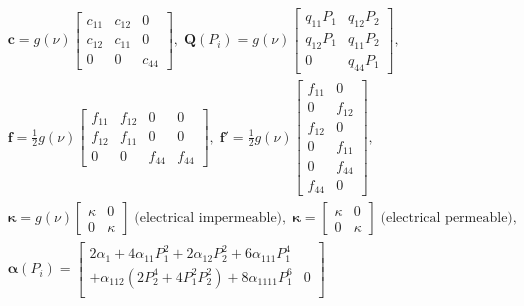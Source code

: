 \documentclass[times,fleqn,11pt]{elsarticle}
\begin{document}
\begin{equation}
    \begin{split}
        &
        {\mathbf{c}}=g(\nu)\begin{bmatrix}
            c_{11} & c_{12} & 0 \\
            c_{12} & c_{11} & 0 \\
            0 & 0 & c_{44}
        \end{bmatrix},\;
        {\mathbf{Q}(P_i)}=g(\nu)\begin{bmatrix}
            q_{11}P_1 & q_{12}P_2 \\
            q_{12}P_1 & q_{11}P_2 \\
            0 &  q_{44}P_1
        \end{bmatrix},\;\\
        &
        {\mathbf{f}}=\frac{1}{2}g(\nu)\begin{bmatrix}
            f_{11} & f_{12} & 0 & 0 \\
            f_{12} & f_{11} & 0 & 0 \\
            0 & 0 & f_{44} & f_{44}
        \end{bmatrix}, \;
        {\mathbf{f}'}=\frac{1}{2}g(\nu)\begin{bmatrix}
            f_{11} & 0 \\
            0 & f_{12} \\
            f_{12} & 0 \\
            0 & f_{11} \\
            0 & f_{44} \\
            f_{44} & 0
        \end{bmatrix},\\
        &
        {\mathbf{\kappa}}=g(\nu)\begin{bmatrix}
            \kappa & 0 \\
            0 & \kappa
        \end{bmatrix}\; \text{(electrical impermeable)},\;
        {\mathbf{\kappa}}=\begin{bmatrix}
            \kappa & 0 \\
            0 & \kappa
        \end{bmatrix}\; \text{(electrical permeable)},\; \\
        &
        \mathbf{\alpha}(P_i)=\begin{bmatrix}
             2\alpha_1+4\alpha_{11}P_1^2+2\alpha_{12}P_2^2+6\alpha_{111}P_1^4 & {}\\
             +\alpha_{112}(2P_2^4+4P_1^2P_2^2)+8\alpha_{1111}P_1^6  & 0\\

\end{bmatrix}
\end{split}
\end{equation}
\end{document}
